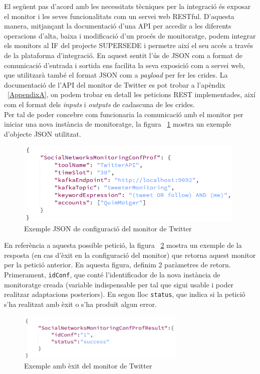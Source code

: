 El següent pas d'acord amb les necessitats tècniques per la integració és exposar el monitor i les seves funcionalitats com un servei web RESTful. D'aquesta manera, mitjançant la documentació d'una API per accedir a les diferents operacions d'alta, baixa i modificació d'un procés de monitoratge, podem integrar els monitors al IF del projecte SUPERSEDE i permetre així el seu accés a través de la plataforma d'integració. En aquest sentit l'ús de JSON com a format de comunicació d'entrada i sortida ens facilita la seva exposició com a servei web, que utilitzarà també el format JSON com a \textit{payload} per fer les crides. La documentació de l'API del monitor de Twitter es pot trobar a l'apèndix ~\ref{AppendixA}, on podem trobar en detall les peticions REST implementades, així com el format dels \textit{inputs} i \textit{outputs} de cadascuna de les crides.\\

Per tal de poder concebre com funcionaria la comunicació amb el monitor per iniciar una nova instància de monitoratge, la figura ~\ref{fig:Figura8} mostra un exemple d'objecte JSON utilitzat.

\begin{figure}[!h]
\centering
\includegraphics[width=11cm]{Figures/Figure8}
\decoRule
\caption[Exemple JSON de configuració del monitor de Twitter]{Exemple JSON de configuració del monitor de Twitter}
\label{fig:Figura8}
\end{figure}

En referència a aquesta possible petició, la figura ~\ref{fig:Figura9} mostra un exemple de la resposta (en cas d'èxit en la configuració del monitor) que retorna aquest monitor per la petició anterior. En aquesta figura, definim 2 paràmetres de retorn. Primerament,  \texttt{idConf}, que conté l'identificador de la nova instància de monitoratge creada (variable indispensable per tal que sigui usable i poder realitzar adaptacions posteriors). En segon lloc \texttt{status}, que indica si la petició s'ha realitzat amb èxit o s'ha produït algun error.

\begin{figure}[!h]
\centering
\includegraphics[width=8cm]{Figures/Figure9}
\decoRule
\caption[Exemple resposta amb èxit del monitor de Twitter]{Exemple amb èxit del monitor de Twitter}
\label{fig:Figura9}
\end{figure}

